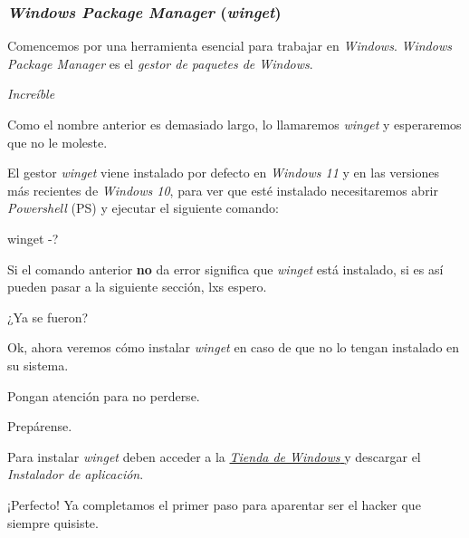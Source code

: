 \subsubsection{\textit{Windows Package Manager} (\textit{winget})}
  
  Comencemos por una herramienta esencial para trabajar en \textit{Windows}.
  \textit{Windows Package Manager} es el \textit{gestor de paquetes 
  de Windows}.

  \begin{center}
    \textit{Increíble}
  \end{center}

  Como el nombre anterior es demasiado largo, lo llamaremos \textit{winget} y esperaremos que no 
  le moleste.

  El gestor \textit{winget} viene instalado por defecto en \textit{Windows 11} y en las versiones
  más recientes de \textit{Windows 10}, para ver que esté instalado necesitaremos abrir 
  \textit{Powershell} (PS) y ejecutar el siguiente comando:

  \begin{powershell}
    winget -?
  \end{powershell}

  Si el comando anterior \textbf{no} da error significa que \textit{winget} está instalado, si es 
  así pueden pasar a la siguiente sección, lxs espero.

  ¿Ya se fueron?
  
  Ok, ahora veremos cómo instalar \textit{winget} en caso de que no lo tengan instalado en su
  sistema.

  Pongan atención para no perderse.

  Prepárense.

  Para instalar \textit{winget} deben acceder a la 
  \href{https://apps.microsoft.com/store/detail/app-installer/9NBLGGH4NNS1}{
    \textit{Tienda de Windows}
  } y descargar el \textit{Instalador de aplicación}.

  ¡Perfecto! Ya completamos el primer paso para aparentar ser el hacker que siempre quisiste.